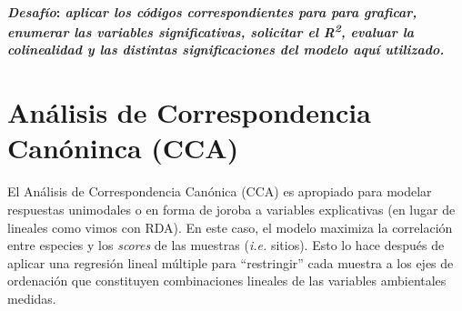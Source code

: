 \documentclass[
]{book}
\begin{document}
\hypertarget{desafuxedo-aplicar-los-cuxf3digos-correspondientes-para-para-graficar-enumerar-las-variables-significativas-solicitar-el-r2-evaluar-la-colinealidad-y-las-distintas-significaciones-del-modelo-aquuxed-utilizado.}{%
\paragraph{\texorpdfstring{\textbf{\emph{Desafío}}: \emph{aplicar los códigos correspondientes para para graficar, enumerar las variables significativas, solicitar el R\textsuperscript{2}, evaluar la colinealidad y las distintas significaciones del modelo aquí utilizado.}}{Desafío: aplicar los códigos correspondientes para para graficar, enumerar las variables significativas, solicitar el R2, evaluar la colinealidad y las distintas significaciones del modelo aquí utilizado.}}\label{desafuxedo-aplicar-los-cuxf3digos-correspondientes-para-para-graficar-enumerar-las-variables-significativas-solicitar-el-r2-evaluar-la-colinealidad-y-las-distintas-significaciones-del-modelo-aquuxed-utilizado.}}

\hypertarget{anuxe1lisis-de-correspondencia-canuxf3ninca-cca}{%
\section{Análisis de Correspondencia Canóninca (CCA)}\label{anuxe1lisis-de-correspondencia-canuxf3ninca-cca}}

El Análisis de Correspondencia Canónica (CCA) es apropiado para modelar respuestas unimodales o en forma de joroba a variables explicativas (en lugar de lineales como vimos con RDA). En este caso, el modelo maximiza la correlación entre especies y los \emph{scores} de las muestras (\emph{i.e.} sitios). Esto lo hace después de aplicar una regresión lineal múltiple para ``restringir'' cada muestra a los ejes de ordenación que constituyen combinaciones lineales de las variables ambientales medidas.
\end{document}
